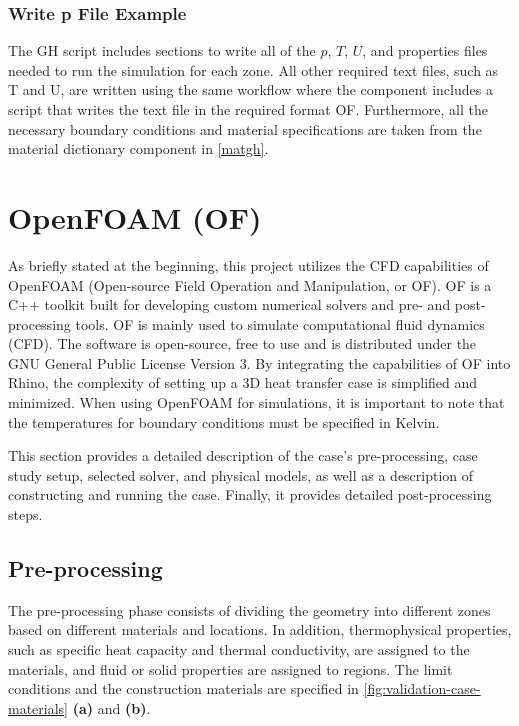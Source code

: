 \subsubsection{Write p File Example}
The \gls{GH} script includes sections to write all of the $p$, $T$, $U$, and properties files needed to run the simulation for each zone. All other required text files, such as T and U, are written using the same workflow where the component includes a script that writes the text file in the required format \gls{OF}. Furthermore, all the necessary boundary conditions and material specifications are taken from the material dictionary component in \cref{matgh}.


















\section[OpenFOAM]{OpenFOAM (OF)}
As briefly stated at the beginning, this project utilizes the CFD capabilities of OpenFOAM (Open-source Field Operation and Manipulation, or OF).  \gls{OF} is a C++ toolkit built for developing custom numerical solvers and pre- and post-processing tools. \gls{OF} is mainly used to simulate computational fluid dynamics (CFD). The software is open-source, free to use and is distributed under the GNU General Public License Version 3.
By integrating the capabilities of \gls{OF} into Rhino, the complexity of setting up a 3D heat transfer case is simplified and minimized. When using OpenFOAM for simulations, it is important to note that the temperatures for boundary conditions must be specified in Kelvin.

This section provides a detailed description of the case's pre-processing, case study setup, selected solver, and physical models, as well as a description of constructing and running the case. 
Finally, it provides detailed post-processing steps.



\subsection{Pre-processing}
The pre-processing phase consists of dividing the geometry into different zones based on different materials and locations. In addition, thermophysical properties, such as specific heat capacity and thermal conductivity, are assigned to the materials, and fluid or solid properties are assigned to regions. The limit conditions and the construction materials are specified in \cref{fig:validation-case-materials} \textbf{(a)} and \textbf{(b)}. 


